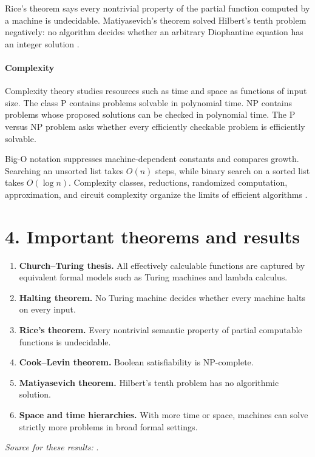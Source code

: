 Rice's theorem says every nontrivial property of the partial function computed by a machine is undecidable. Matiyasevich's theorem solved Hilbert's tenth problem negatively: no algorithm decides whether an arbitrary Diophantine equation has an integer solution \cite{computation_ref3}.

\paragraph{Complexity}
Complexity theory studies resources such as time and space as functions of input size. The class P contains problems solvable in polynomial time. NP contains problems whose proposed solutions can be checked in polynomial time. The P versus NP problem asks whether every efficiently checkable problem is efficiently solvable.

Big-O notation suppresses machine-dependent constants and compares growth. Searching an unsorted list takes $O(n)$ steps, while binary search on a sorted list takes $O(\log n)$. Complexity classes, reductions, randomized computation, approximation, and circuit complexity organize the limits of efficient algorithms \cite{computation_ref4}.

\section*{4. Important theorems and results}
\begin{enumerate}[leftmargin=*,itemsep=0.35em]
\item \textbf{Church--Turing thesis.} All effectively calculable functions are captured by equivalent formal models such as Turing machines and lambda calculus.

\item \textbf{Halting theorem.} No Turing machine decides whether every machine halts on every input.

\item \textbf{Rice's theorem.} Every nontrivial semantic property of partial computable functions is undecidable.

\item \textbf{Cook--Levin theorem.} Boolean satisfiability is NP-complete.

\item \textbf{Matiyasevich theorem.} Hilbert's tenth problem has no algorithmic solution.

\item \textbf{Space and time hierarchies.} With more time or space, machines can solve strictly more problems in broad formal settings.
\end{enumerate}
\noindent\emph{Source for these results:} \cite{computation_ref1}.

